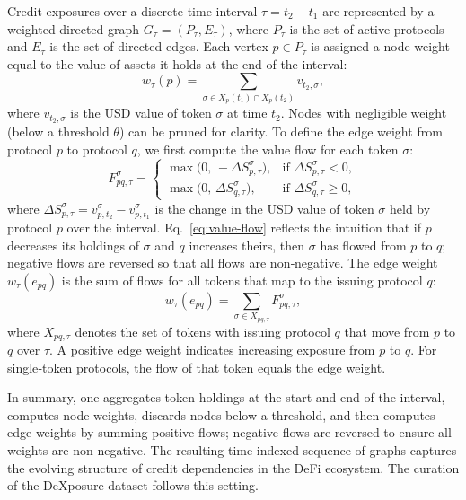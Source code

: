Credit exposures over a discrete time interval $\tau = t_2 - t_1$ are represented by a weighted directed graph $G_\tau = (P_\tau, E_\tau)$, where $P_\tau$ is the set of active protocols and $E_\tau$ is the set of directed edges.  Each vertex $p\in P_\tau$ is assigned a {node weight} equal to the value of assets it holds at the end of the interval:
\begin{equation}
w_\tau(p) = \sum_{\sigma\in X_p(t_1)\cap X_p(t_2)} v_{t_2,\sigma},
\label{eq:node-weight}
\end{equation}
where $v_{t_2,\sigma}$ is the USD value of token $\sigma$ at time $t_2$.  Nodes with negligible weight (below a threshold $\theta$) can be pruned for clarity.  To define the {edge weight} from protocol $p$ to protocol $q$, we first compute the value flow for each token $\sigma$:
\begin{equation}
F^{\sigma}_{p q,\tau} =
\begin{cases}
\max\bigl(0,\, -\Delta S^{\sigma}_{p,\tau}\bigr), & \text{if } \Delta S^{\sigma}_{p,\tau} < 0,\\
\max\bigl(0,\,\Delta S^{\sigma}_{q,\tau}\bigr), & \text{if } \Delta S^{\sigma}_{q,\tau} \ge 0,
\end{cases}
\label{eq:value-flow}
\end{equation}
where $\Delta S^{\sigma}_{p,\tau}=v_{p,t_2}^{\sigma}-v_{p,t_1}^{\sigma}$ is the change in the USD value of token $\sigma$ held by protocol $p$ over the interval.  Eq.~\eqref{eq:value-flow} reflects the intuition that if $p$ decreases its holdings of $\sigma$ and $q$ increases theirs, then $\sigma$ has flowed from $p$ to $q$; negative flows are reversed so that all flows are non‑negative.  The {edge weight} $w_\tau(e_{p q})$ is the sum of flows for all tokens that map to the issuing protocol $q$:
\begin{equation}
w_\tau(e_{p q}) = \sum_{\sigma \in X_{p q, \tau}} F^{\sigma}_{p q,\tau},
\label{eq:edge-weight}
\end{equation}
where $X_{p q,\tau}$ denotes the set of tokens with issuing protocol $q$ that move from $p$ to $q$ over $\tau$.  A positive edge weight indicates increasing exposure from $p$ to $q$.  For single‑token protocols, the flow of that token equals the edge weight.

In summary, one aggregates token holdings at the start and end of the interval, computes node weights, discards nodes below a threshold, and then computes edge weights by summing positive flows; negative flows are reversed to ensure all weights are non‑negative.  The resulting time‑indexed sequence of graphs captures the evolving structure of credit dependencies in the DeFi ecosystem. The curation of the DeXposure dataset follows this setting.

